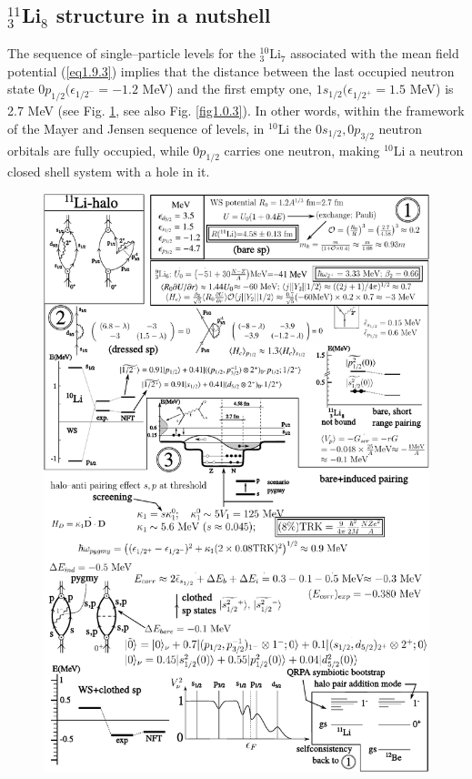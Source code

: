 \subsection{$^{11}_3$Li$_8$ structure in a nutshell}\label{S1.9.3}
The sequence of single--particle levels for the $^{10}_3$Li$_7$ associated with the mean field potential (\ref{eq1.9.3}) implies that the distance between the last occupied neutron state $0p_{1/2}(\epsilon_{1/2^-}=-1.2$ MeV) and  the first empty one, $1s_{1/2}(\epsilon_{1/2^+}=1.5$ MeV) is 2.7 MeV (see Fig. \ref{fig1.9.1}, see also Fig. \ref{fig1.0.3}). In other words, within the framework of the Mayer and Jensen sequence of levels, in $^{10}$Li the $0s_{1/2},0p_{3/2}$ neutron orbitals are fully occupied, while $0p_{1/2}$ carries one neutron, making $^{10}$Li a neutron closed shell system with a hole in it.
     \begin{figure}
     \centerline {
     \includegraphics*[width=16cm]{introduccion/figs/fig1_9_1}
     }
     \caption{}
     \label{fig1.9.1}
     \end{figure}
 
